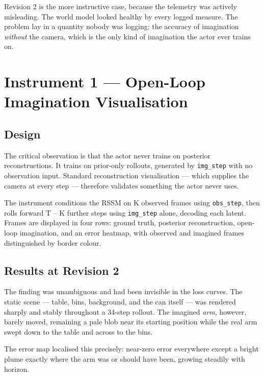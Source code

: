 \documentclass[12pt,a4paper,oneside]{report}
\begin{document}
Revision 2 is the more instructive case, because the telemetry was actively
misleading. The world model looked healthy by every logged measure. The problem
lay in a quantity nobody was logging: the accuracy of imagination \emph{without} the
camera, which is the only kind of imagination the actor ever trains on.

\hypertarget{instrument-1-open-loop-imagination-visualisation}{%
\section{Instrument 1 --- Open-Loop Imagination Visualisation}\label{instrument-1-open-loop-imagination-visualisation}}

\hypertarget{design}{%
\subsection{Design}\label{design}}

The critical observation is that the actor never trains on posterior
reconstructions. It trains on prior-only rollouts, generated by \texttt{img\_step} with
no observation input. Standard reconstruction visualisation --- which supplies the
camera at every step --- therefore validates something the actor never uses.

The instrument conditions the RSSM on K observed frames using \texttt{obs\_step}, then
rolls forward T -- K further steps using \texttt{img\_step} alone, decoding each latent.
Frames are displayed in four rows: ground truth, posterior reconstruction,
open-loop imagination, and an error heatmap, with observed and imagined frames
distinguished by border colour.

\hypertarget{results-at-revision-2}{%
\subsection{Results at Revision 2}\label{results-at-revision-2}}

The finding was unambiguous and had been invisible in the loss curves. The
static scene --- table, bins, background, and the can itself --- was rendered
sharply and stably throughout a 34-step rollout. The imagined \emph{arm}, however,
barely moved, remaining a pale blob near its starting position while the real
arm swept down to the table and across to the bins.

The error map localised this precisely: near-zero error everywhere except a
bright plume exactly where the arm was or should have been, growing steadily
with horizon.
\end{document}
